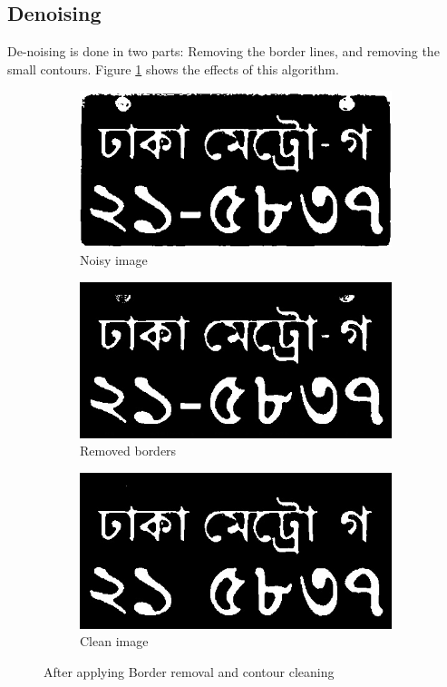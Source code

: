 \documentclass{standalone}
\begin{document}
\subsection{Denoising}
De-noising is done in two parts: Removing the border lines, and removing the small contours. Figure \ref{fig:CleaningStage} shows the effects of this algorithm.
\begin{figure}
\begin{subfigure}{.45\textwidth}
  \centering
  \includegraphics[width=.8\linewidth]{./img/sample/stage11.jpg}
  \caption{Noisy image}
\end{subfigure}
\begin{subfigure}{.45\textwidth}
  \centering
  \includegraphics[width=.8\linewidth]{./img/sample/stage12.jpg}
  \caption{Removed borders}
\end{subfigure}
\begin{subfigure}{0.9\textwidth}
  \centering
  \includegraphics[width=.8\linewidth]{./img/sample/stage13.jpg}
  \caption{Clean image}
\end{subfigure}
\caption{After applying Border removal and contour cleaning}
\label{fig:CleaningStage}
\end{figure}
\end{document}
